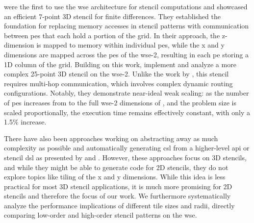 \citeauthor{rocki2020fast} \cite{rocki2020fast} were the first to use the \ac{wse} architecture for stencil computations and showcased an efficient 7-point 3D stencil for finite differences.
They established the foundation for replacing memory accesses in stencil patterns with communication between \acp{pe} that each hold a portion of the grid. In their approach, the z-dimension is mapped to memory within individual \acp{pe}, while the x and y dimensions are mapped across the \acp{pe} of the \ac{wse}-2, resulting in each \ac{pe} storing a 1D column of the grid.
Building on this work, \citeauthor{jacquelin2022scalable} \cite{jacquelin2022scalable} implement and analyze a more complex 25-point 3D stencil on the \ac{wse}-2. Unlike the work by \citeauthor{rocki2020fast} \cite{rocki2020fast}, this stencil requires multi-hop communication, which involves complex dynamic routing configurations.
Notably, they demonstrate near-ideal weak scaling: as the number of \acp{pe} increases from  to the full \ac{wse}-2 dimensions of , and the problem size is scaled proportionally, the execution time remains effectively constant, with only a 1.5\% increase.

There have also been approaches working on abstracting away as much complexity as possible and automatically generating \ac{csl} from a higher-level \ac{api} or stencil \ac{dsl} as presented by \citeauthor{woo2022disruptive} \cite{woo2022disruptive} and \citeauthor{sai2024automated} \cite{sai2024automated}. However, these approaches focus on 3D stencils, and while they might be able to generate code for 2D stencils, they do not explore topics like tiling of the x and y dimensions. While this idea is less practical for most 3D stencil applications, it is much more promising for 2D stencils and therefore the focus of our work. We furthermore systematically analyze the performance implications of different tile sizes and radii, directly comparing low-order and high-order stencil patterns on the \ac{wse}.